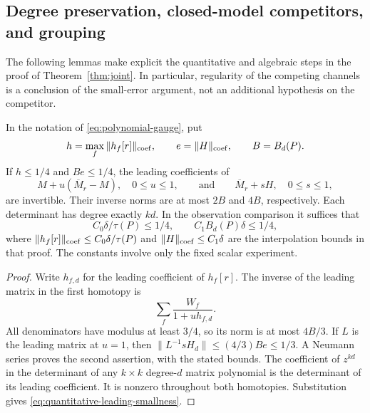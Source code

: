\subsection{Degree preservation, closed-model competitors, and grouping}
The following lemmas make explicit the quantitative and algebraic
steps in the proof of Theorem~\ref{thm:joint}. In particular, regularity
of the competing channels is a conclusion of the small-error argument,
not an additional hypothesis on the competitor.

\begin{lemma}\label{lem:leading-homotopies}
In the notation of \eqref{eq:polynomial-gauge}, put
\[
 h=\max_f\|h_f[r]\|_{\rm coef},\qquad
 e=\|H\|_{\rm coef},\qquad B=B_d(P).
\]
If $h\le1/4$ and $Be\le1/4$, the leading coefficients of
\[
 M+u(\overline M_r-M),\quad 0\le u\le1,
 \qquad\text{and}\qquad \overline M_r+sH,\quad0\le s\le1,
\]
are invertible. Their inverse norms are at most $2B$ and $4B$,
respectively. Each determinant has degree exactly $kd$.
In the observation comparison it suffices that
\begin{equation}\label{eq:quantitative-leading-smallness}
 C_0\delta/\tau(P)\le1/4,\qquad C_1B_d(P)\delta\le1/4,
\end{equation}
where $\|h_f[r]\|_{\rm coef}\le C_0\delta/\tau(P)$ and
$\|H\|_{\rm coef}\le C_1\delta$ are the interpolation bounds in that
proof. The constants involve only the fixed scalar experiment.
\end{lemma}
\begin{proof}
Write $h_{f,d}$ for the leading coefficient of $h_f[r]$. The inverse of
the leading matrix in the first homotopy is
\[
 \sum_f\frac{W_f}{1+u h_{f,d}}.
\]
All denominators have modulus at least $3/4$, so its norm is at most
$4B/3$. If $L$ is the leading matrix at $u=1$, then
$\|L^{-1}sH_d\|\le(4/3)Be\le1/3$. A Neumann series proves the
second assertion, with the stated bounds. The coefficient of $z^{kd}$
in the determinant of any $k\times k$ degree-$d$ matrix polynomial
is the determinant of its leading coefficient. It is nonzero
throughout both homotopies. Substitution gives
\eqref{eq:quantitative-leading-smallness}.
\end{proof}

